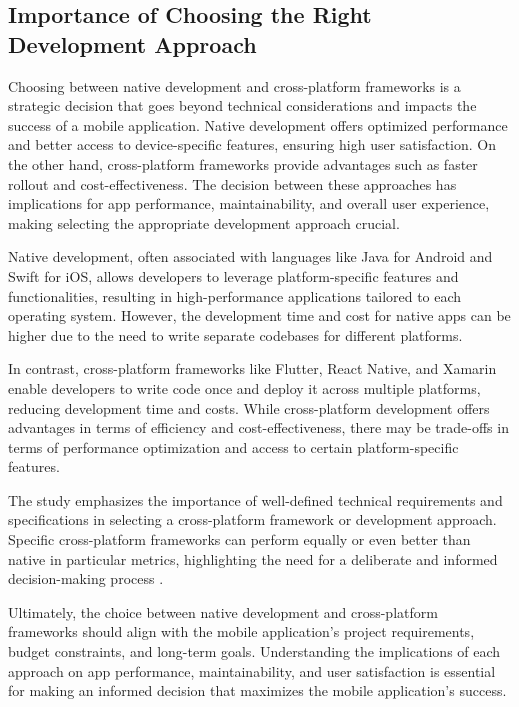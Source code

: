 \subsection{Importance of Choosing the Right Development Approach}
Choosing between native development and cross-platform frameworks is a strategic decision that goes beyond technical considerations and impacts the success of a mobile application. Native development offers optimized performance and better access to device-specific features, ensuring high user satisfaction. On the other hand, cross-platform frameworks provide advantages such as faster rollout and cost-effectiveness. The decision between these approaches has implications for app performance, maintainability, and overall user experience, making selecting the appropriate development approach crucial.
\par
Native development, often associated with languages like Java for Android and Swift for iOS, allows developers to leverage platform-specific features and functionalities, resulting in high-performance applications tailored to each operating system. However, the development time and cost for native apps can be higher due to the need to write separate codebases for different platforms.
\par
In contrast, cross-platform frameworks like Flutter, React Native, and Xamarin enable developers to write code once and deploy it across multiple platforms, reducing development time and costs. While cross-platform development offers advantages in terms of efficiency and cost-effectiveness, there may be trade-offs in terms of performance optimization and access to certain platform-specific features.
\par
The study emphasizes the importance of well-defined technical requirements and specifications in selecting a cross-platform framework or development approach. Specific cross-platform frameworks can perform equally or even better than native in particular metrics, highlighting the need for a deliberate and informed decision-making process \cite{biorn2020empirical}.
\par
Ultimately, the choice between native development and cross-platform frameworks should align with the mobile application’s project requirements, budget constraints, and long-term goals. Understanding the implications of each approach on app performance, maintainability, and user satisfaction is essential for making an informed decision that maximizes the mobile application's success.
